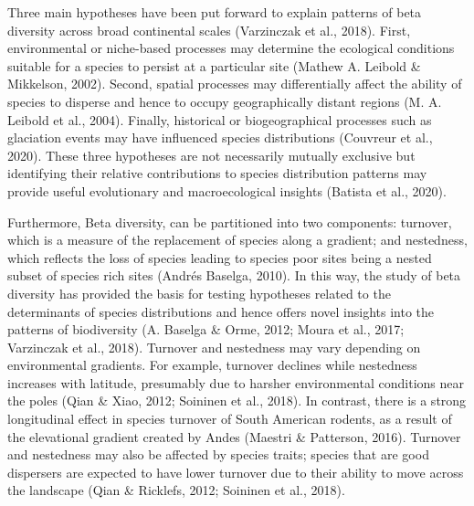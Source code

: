 \documentclass{article}
\begin{document}
\vspace{5mm}
Three main hypotheses have been put forward to explain patterns of beta diversity across broad continental scales (Varzinczak et al., 2018). First, environmental or niche-based processes may determine the ecological conditions suitable for a species to persist at a particular site (Mathew A. Leibold \& Mikkelson, 2002). Second, spatial processes may differentially affect the ability of species to disperse and hence to occupy geographically distant regions (M. A. Leibold et al., 2004). Finally, historical or biogeographical processes such as glaciation events may have influenced species distributions (Couvreur et al., 2020). These three hypotheses are not necessarily mutually exclusive but identifying their relative contributions to species distribution patterns may provide useful evolutionary and macroecological insights (Batista et al., 2020).

\vspace{5mm}

Furthermore, Beta diversity, can be partitioned into two components: turnover, which is a measure of the replacement of species along a gradient; and nestedness, which reflects the loss of species leading to species poor sites being a nested subset of species rich sites (Andrés Baselga, 2010). %
In this way, the study of beta diversity has provided the basis for testing hypotheses related to the determinants of species distributions and hence offers novel insights into the patterns of biodiversity (A. Baselga \& Orme, 2012; Moura et al., 2017; Varzinczak et al., 2018). %
Turnover and nestedness may vary depending on environmental gradients. For example, turnover declines while nestedness increases with latitude, presumably due to harsher environmental conditions near the poles (Qian \& Xiao, 2012; Soininen et al., 2018). In contrast, there is a strong longitudinal effect in species turnover of South American rodents, as a result of the elevational gradient created by Andes (Maestri \& Patterson, 2016). Turnover and nestedness may also be affected by species traits;  species that are good dispersers are expected to have lower turnover due to their ability to move across the landscape (Qian \& Ricklefs, 2012; Soininen et al., 2018). 
\end{document}
